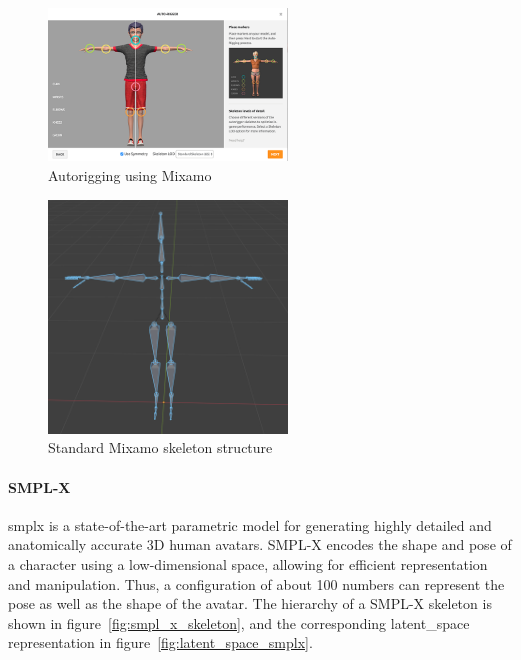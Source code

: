 \documentclass[../../main.tex]{subfiles}
\begin{document}
\begin{figure} 
  \centering \includegraphics[width = 2.5in]{chapters/background_work/images/mixamo_autorigging.png} 
  \caption{Autorigging using Mixamo} 
  \label{fig:mixamo_autorigging} 
\end{figure}

\begin{figure} 
  \centering \includegraphics[width = 2.5in]{chapters/background_work/images/mixamo_skeleton.png} 
  \caption{Standard Mixamo skeleton structure} 
  \label{fig:mixamo_skeleton} 
\end{figure}

\paragraph{SMPL-X}
\label{ch:background_work:sign_language_synthesis:3d_techniques:skeleton:smpl_x}

\gls{smplx} is a state-of-the-art parametric model for generating highly detailed and anatomically accurate 3D human avatars. SMPL-X encodes the shape and pose of a character using a low-dimensional space, allowing for efficient representation and manipulation. Thus, a configuration of about 100 numbers can represent the pose as well as the shape of the avatar. The hierarchy of a SMPL-X skeleton is shown in figure~\ref{fig:smpl_x_skeleton}, and the corresponding \gls{latent_space} representation in figure~\ref{fig:latent_space_smplx}.
\end{document}
